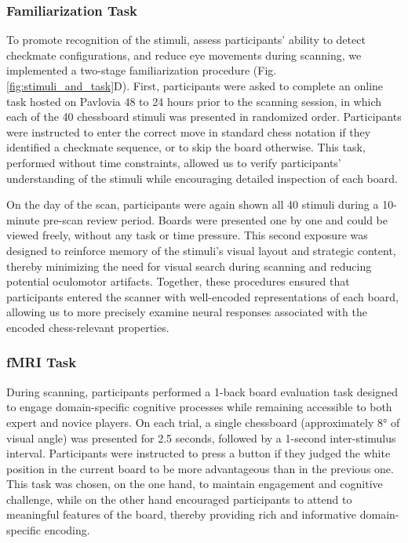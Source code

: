 \documentclass[preprint,12pt]{elsarticle}
\begin{document}
\subsubsection{Familiarization Task}
To promote recognition of the stimuli, assess participants’ ability to detect checkmate configurations, and reduce eye movements during scanning, we implemented a two-stage familiarization procedure (Fig. \ref{fig:stimuli_and_task}D). First, participants were asked to complete an online task hosted on Pavlovia 48 to 24 hours prior to the scanning session, in which each of the 40 chessboard stimuli was presented in randomized order. Participants were instructed to enter the correct move in standard chess notation if they identified a checkmate sequence, or to skip the board otherwise. This task, performed without time constraints, allowed us to verify participants' understanding of the stimuli while encouraging detailed inspection of each board.

On the day of the scan, participants were again shown all 40 stimuli during a 10-minute pre-scan review period. Boards were presented one by one and could be viewed freely, without any task or time pressure. This second exposure was designed to reinforce memory of the stimuli’s visual layout and strategic content, thereby minimizing the need for visual search during scanning and reducing potential oculomotor artifacts. Together, these procedures ensured that participants entered the scanner with well-encoded representations of each board, allowing us to more precisely examine neural responses associated with the encoded chess-relevant properties.

\subsubsection{fMRI Task}
During scanning, participants performed a 1-back board evaluation task designed to engage domain-specific cognitive processes while remaining accessible to both expert and novice players. On each trial, a single chessboard (approximately 8° of visual angle) was presented for 2.5 seconds, followed by a 1-second inter-stimulus interval. Participants were instructed to press a button if they judged the white position in the current board to be more advantageous than in the previous one. This task was chosen, on the one hand, to maintain engagement and cognitive challenge, while on the other hand encouraged participants to attend to meaningful features of the board, thereby providing rich and informative domain-specific encoding.
\end{document}
